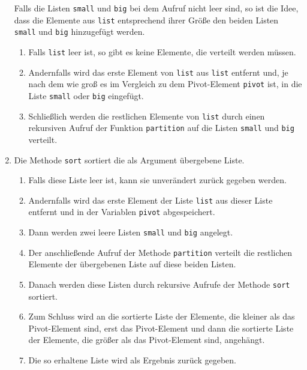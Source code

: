 \begin{enumerate}
      Falls die Listen \texttt{small} und \texttt{big} bei dem Aufruf nicht leer sind,
      so ist die Idee, dass die Elemente aus \texttt{list} entsprechend ihrer Gr\"o\ss{}e
      den beiden Listen \texttt{small} und \texttt{big} hinzugef\"ugt werden.
      \begin{enumerate}
      \item Falls \texttt{list} leer ist, so gibt es keine Elemente, die verteilt werden
            m\"ussen.
      \item Andernfalls wird das erste Element von \texttt{list} aus \texttt{list}
            entfernt und, je nach dem wie gro\ss{} es im Vergleich zu dem Pivot-Element
            \texttt{pivot} ist, in die Liste \texttt{small} oder \texttt{big} eingef\"ugt.
      \item Schlie\ss{}lich werden die restlichen Elemente von \texttt{list} durch einen
            rekursiven Aufruf der Funktion \texttt{partition} auf die Listen \texttt{small}
            und \texttt{big} verteilt.
      \end{enumerate}
\item Die Methode \texttt{sort} sortiert die als Argument \"ubergebene Liste. 
      \begin{enumerate}
      \item Falls diese Liste leer ist, kann sie unver\"andert zur\"uck gegeben werden.
      \item Andernfalls wird das erste Element der Liste \texttt{list} aus dieser Liste
            entfernt und in der Variablen \texttt{pivot}
            abgespeichert.
      \item Dann werden zwei leere Listen \texttt{small} und \texttt{big} angelegt.
      \item Der anschlie\ss{}ende Aufruf der Methode \texttt{partition} verteilt die restlichen
            Elemente der \"ubergebenen Liste auf diese beiden Listen.
      \item Danach werden diese Listen durch rekursive Aufrufe der Methode
            \texttt{sort} sortiert.
      \item Zum Schluss wird an die sortierte Liste der Elemente, die kleiner als das
            Pivot-Element sind, erst das Pivot-Element und dann die sortierte Liste der Elemente,
            die gr\"o\ss{}er als das Pivot-Element sind, angeh\"angt.
      \item Die so erhaltene Liste wird als Ergebnis zur\"uck gegeben.
      \end{enumerate}
\end{enumerate}

